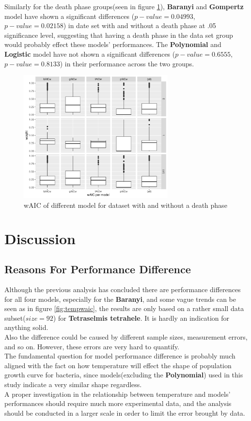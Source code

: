 \documentclass[11pt]{article}
\begin{document}
\FloatBarrier
Similarly for the death phase groups(seen in figure \ref{fig:deathphasewaic}), \textbf{Baranyi} and \textbf{Gompertz} model have shown a significant differences ($p-value = 0.04993$, $p-value = 0.02158$) in date set with and without a death phase at .05 significance level, suggesting that having a death phase in the data set group would probably effect these models' performances. The \textbf{Polynomial} and \textbf{Logistic} model have not shown a significant differences ($p-value = 0.6555$, $p-value = 0.8133$) in their performance across the two groups.
\FloatBarrier
\begin{figure}[!htbp]
    \centering
    \includegraphics[width=0.7\textwidth]{../Results/anaPlots/wAICdeathphase.pdf}
    \caption{wAIC of different model for dataset with and without a death phase}
    \label{fig:deathphasewaic}
\end{figure}
\FloatBarrier

\section{Discussion}
\subsection{Reasons For Performance Difference}
Although the previous analysis has concluded there are performance differences for all four models, especially for the \textbf{Baranyi}, and some vague trends can be seen as in figure \ref{fig:tempwaic}, the results are only based on a rather small data subset($size = 92$) for \textbf{Tetraselmis tetrahele}. It is hardly an indication for anything solid.\\
Also the difference could be caused by different sample sizes, measurement errors, and so on. However, these errors are very hard to quantify.\\
The fundamental question for model performance difference is probably much aligned with the fact on how temperature will effect the shape of population growth curve for bacteria, since models(excluding the \textbf{Polynomial}) used in this study indicate a very similar shape regardless.\\
A proper investigation in the relationship between temperature and models' performances should require much more experimental data, and the analysis should be conducted in a larger scale in order to limit the error brought by data.
\end{document}
